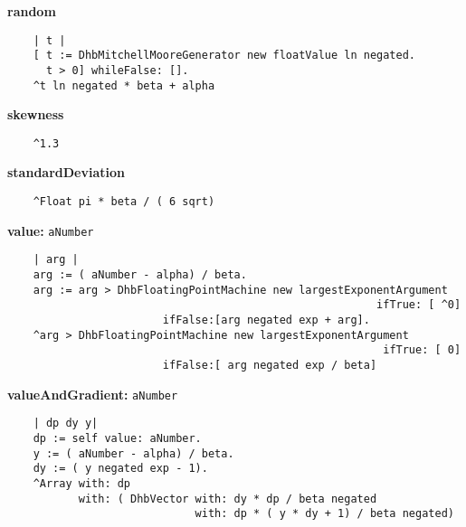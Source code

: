{\bf random}
\begin{verbatim}
    | t |
    [ t := DhbMitchellMooreGenerator new floatValue ln negated.
      t > 0] whileFalse: [].
    ^t ln negated * beta + alpha

\end{verbatim}
{\bf skewness}
\begin{verbatim}
    ^1.3

\end{verbatim}
{\bf standardDeviation}
\begin{verbatim}
    ^Float pi * beta / ( 6 sqrt)

\end{verbatim}
{\bf value:} {\tt aNumber}
\begin{verbatim}
    | arg |
    arg := ( aNumber - alpha) / beta.
    arg := arg > DhbFloatingPointMachine new largestExponentArgument 
                                                         ifTrue: [ ^0]
                        ifFalse:[arg negated exp + arg].
    ^arg > DhbFloatingPointMachine new largestExponentArgument 
                                                          ifTrue: [ 0]
                        ifFalse:[ arg negated exp / beta]

\end{verbatim}
{\bf valueAndGradient:} {\tt aNumber}
\begin{verbatim}
    | dp dy y|
    dp := self value: aNumber.
    y := ( aNumber - alpha) / beta.
    dy := ( y negated exp - 1).
    ^Array with: dp
           with: ( DhbVector with: dy * dp / beta negated
                             with: dp * ( y * dy + 1) / beta negated)

\end{verbatim}

